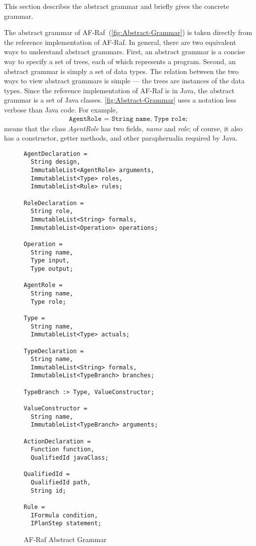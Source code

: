 \documentclass[a4paper,12pt,oneside,fleqn]{book} %
\begin{document}
This section describes the abstract grammar and briefly gives the concrete
grammar.

The abstract grammar of AF-Raf~(\autoref{fig:Abstract-Grammar}) is taken
directly from the reference implementation of AF-Raf.  In general, there
are two equivalent ways to understand abstract grammars. First, an abstract
grammar is a concise way to specify a set of trees, each of which
represents a program. Second, an abstract grammar is simply a set of data
types. The relation between the two ways to view abstract grammars is
simple --- the trees are instances of the data types. Since the reference
implementation of AF-Raf is in Java, the abstract grammar is a set of Java
classes. \autoref{fig:Abstract-Grammar} uses a notation less verbose than
Java code. For example,
\begin{align}
\texttt{AgentRole = String name, Type role;}
\end{align}
means that the class {\it AgentRole\/} has two fields, {\it name\/} and
{\it role}; of course, it also has a constructor, getter methods, and other
paraphernalia required by Java.

\begin{figure}\footnotesize %
\begin{verbatim}
AgentDeclaration =
  String design,
  ImmutableList<AgentRole> arguments,
  ImmutableList<Type> roles,
  ImmutableList<Rule> rules;

RoleDeclaration =
  String role,
  ImmutableList<String> formals,
  ImmutableList<Operation> operations;

Operation =
  String name,
  Type input,
  Type output;

AgentRole =
  String name,
  Type role;

Type =
  String name,
  ImmutableList<Type> actuals;

TypeDeclaration =
  String name,
  ImmutableList<String> formals,
  ImmutableList<TypeBranch> branches;

TypeBranch :> Type, ValueConstructor;

ValueConstructor =
  String name,
  ImmutableList<TypeBranch> arguments;

ActionDeclaration =
  Function function,
  QualifiedId javaClass;

QualifiedId =
  QualifiedId path,
  String id;

Rule =
  IFormula condition,
  IPlanStep statement;
\end{verbatim}
\caption{AF-Raf Abstract Grammar}
\label{fig:Abstract-Grammar}
\end{figure}
\end{document}
